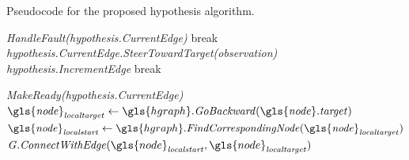 \noindent
\begin{algorithm}[H]
  \caption{Pseudocode for the proposed hypothesis algorithm.}\label{pseudocode:halgorithm}
  \begin{algorithmic}[1]

    \hspace{-0.9cm}\colorbox{my_grey}{\parbox{\linewidth}{%

        \hspace{-0.1cm}\colorbox{my_yellow}{\parbox{\linewidth}{%

            \hspace{-0.1cm}\colorbox{my_light_blue}{\parbox{\linewidth}{%
                 
                \State \textit{HandleFault(\gls{hypothesis}.CurrentEdge)}
                \State break
                \EndIf
                \State \textit{\gls{hypothesis}.CurrentEdge.SteerTowardTarget(\gls{observation})}
                  \State \textit{\gls{hypothesis}.IncrementEdge}
                \Else
                  \State break
                \EndIf
                \EndIf
                \EndWhile
            }}
            \Else
            \State \textit{MakeReady(\gls{hypothesis}.CurrentEdge)}
            \EndIf
            \Else
            \State $\mathit{\gls{node}_{localtarget}} \leftarrow \gls{hgraph}.\mathit{GoBackward(\gls{node}.target)}$
            \State $\mathit{\gls{node}_{localstart}} \leftarrow \gls{hgraph}.\mathit{FindCorrespondingNode(\gls{node}_{localtarget})}$
            \State $\mathit{G.ConnectWithEdge}(\gls{node}_\mathit{localstart}, \gls{node}_\mathit{localtarget})$
            \EndIf
            \EndWhile
        }}
        \EndFor
    }}
  \end{algorithmic}
\end{algorithm}




